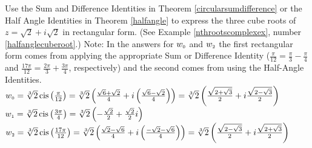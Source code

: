 { Use the Sum and Difference Identities in Theorem \ref{circularsumdifference} or the Half Angle Identities in Theorem \ref{halfangle} to express the three cube roots of $z=\sqrt{2} + i\sqrt{2}$ in rectangular form. (See Example \ref{nthrootscomplexex}, number \ref{halfanglecuberoot}.)}
{ Note: In the answers for $w_{\text{\tiny$0$}}$ and $w_{\text{\tiny$2$}}$ the first rectangular form comes from applying the appropriate Sum or Difference Identity ($\frac{\pi}{12} = \frac{\pi}{3} - \frac{\pi}{4}$ and $\frac{17\pi}{12} = \frac{2\pi}{3} + \frac{3\pi}{4}$, respectively) and the second comes from using the Half-Angle Identities. \\$w_{\text{\tiny$0$}} = \sqrt[3]{2} \operatorname{cis}\left(\frac{\pi}{12}\right) = \sqrt[3]{2}\left( \frac{\sqrt{6} + \sqrt{2}}{4} + i\left( \frac{\sqrt{6} - \sqrt{2}}{4} \right) \right) = \sqrt[3]{2}\left( \frac{\sqrt{2 + \sqrt{3}}}{2} + i\frac{\sqrt{2 - \sqrt{3}}}{2} \right)$ \\$w_{\text{\tiny$1$}} = \sqrt[3]{2} \operatorname{cis}\left(\frac{3\pi}{4}\right) = \sqrt[3]{2} \left( -\frac{\sqrt{2}}{2} + \frac{\sqrt{2}}{2}i \right)$ \\$w_{\text{\tiny$2$}} = \sqrt[3]{2} \operatorname{cis}\left(\frac{17\pi}{12}\right) = \sqrt[3]{2}\left( \frac{\sqrt{2} - \sqrt{6}}{4} + i\left( \frac{-\sqrt{2} - \sqrt{6}}{4} \right) \right) = \sqrt[3]{2}\left( \frac{\sqrt{2 - \sqrt{3}}}{2} + i\frac{\sqrt{2 + \sqrt{3}}}{2} \right)$}
